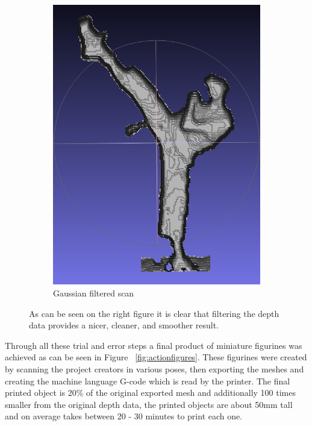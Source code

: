 \documentclass[pdftex,10.5pt]{report}
\begin{document}
\begin{figure}[H]
\begin{subfigure}[H]{0.4\textwidth}
		\includegraphics[width=\textwidth]{figures/filter}
		\caption{Gaussian filtered scan}
	\end{subfigure}
	\caption{As can be seen on the right figure it is clear that filtering the depth data provides 
		a nicer, cleaner, and smoother result.
	}
	\label{fig:filtering}
\end{figure}

Through all these trial and error steps a final product of miniature figurines was achieved as can be seen in Figure ~\ref{fig:actionfigures}. These figurines were created by scanning the project creators in various poses, then exporting the meshes and creating the machine language G-code which is read by the printer. The final printed object is 20\% of the original exported mesh and additionally 100 times smaller from the original depth data, the printed objects are about 50mm tall and on average takes between 20 - 30 minutes to print each one.
\end{document}
